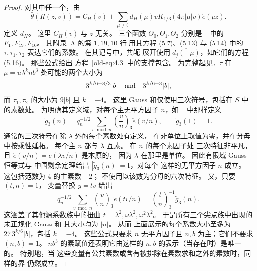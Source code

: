 \documentclass[11pt,a4paper]{article}
\numberwithin{equation}{section}
\numberwithin{figure}{section}
\theoremstyle{definition}
\theoremstyle{remark}
\begin{document}
\begin{proof}
对其中任一个，由
\begin{equation}\label{eq:reflection-cusp-expansion}
 \bar\theta(H(z,v))=C_H(v)+
 \sum_{\mu\ne0}d_H(\mu)vK_{1/3}(4\pi|\mu|v)\check e(\mu z).
\end{equation}
定义 $d_H$。 这里 $C_H(v)$ 与 $z$ 无关。
三个函数 $\Theta_0,\Theta_1,\Theta_2$ 分别是
~\cite{DR} 中的 $F_1,F_{19},F_{10}$。 其附录~A 的第 $1,19,10$ 行
用其方程 (5.7)、(5.13) 与 (5.14) 中的 $\tau,\tau_1,\tau_2$
表达它们的系数。 在其记号中，共轭
展开使用 $\overline{d_j(-\mu)}$，如它们的方程 (5.16)。
那些公式给出
方程~\eqref{old-eq:4.3} 中的支撑包含。 为完整起见，$\tau$ 在
$\mu=u\lambda^k n b^3$ 处可能的两个大小为
\[
 3^{k/6+8/3}|b|\quad\hbox{and}\quad3^{k/6+3}|b|,
\]
而 $\tau_1,\tau_2$ 的大小为 $9|b|$ 且 $k=-4$。
这里 Gauss 和仅使用三次符号，包括在 $S$ 中的素数处。
为明确其定义域，对每个主无平方因子 $n$，如
~\cite[方程 (1.7)]{DR} 中那样定义
\begin{equation}\label{eq:reflection-cubic-source-gauss}
 \widetilde g_3(n)=q_n^{-1/2}\sum_{v\bmod n}
       \left(\frac vn\right)_3\check e(v/n),
 \qquad \widetilde g_3(1)=1.
\end{equation}
通常的三次符号在除 $\lambda$ 外的每个素数处有定义，
在非单位上取值为零，并在分母中按乘性延拓。
每个主 $n$ 都与 $\lambda$ 互素。 在 $n$ 的每个素因子处
三次特征非平凡，且 $\check e(v/n)=e(\lambda v/n)$ 是本原的，
因为 $\lambda$ 在那里是单位。 因此有限域 Gauss 恒等式与
中国剩余定理给出 $|\widetilde g_3(n)|=1$，对每个
这样的无平方因子 $n$ 成立。 这包括范数为 $4$ 的主素数 $-2$；
不使用以该数为分母的六次特征。 又，只要 $(t,n)=1$，
变量替换 $y=tv$ 给出
\[
 q_n^{-1/2}\sum_{v\bmod n}\left(\frac vn\right)_3\check e(tv/n)
       =\left(\frac tn\right)_3^{-1}\widetilde g_3(n).
\]
这涵盖了其他源系数族中的扭曲 $t=\lambda^2,\omega\lambda^2,\omega^2\lambda^2$。
于是所有三个尖点族中出现的未正规化 Gauss 和
其大小均为 $|n|$。 从而
上面展示的每个系数大小至多为
$27\,3^{k/6}|b|$，包括 $k=-4$。 这些公式只要求
$n$ 无平方因子且 $n,b$ 为主；它们不要求
$(n,b)=1$。 $nb^3$ 的素赋值还表明它由这样的 $n,b$
的表示（当存在时）是唯一的。 特别地，当
这些变量有公共素数或含有被排除在素数求和之外的素数时，同样的界
仍然成立。


\end{proof}
\end{document}

